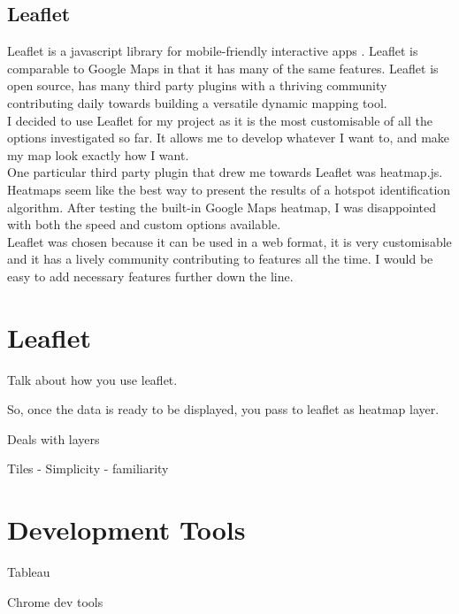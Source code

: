 \subsection{Leaflet}

Leaflet is a javascript library for mobile-friendly interactive apps \cite{leaflet}. Leaflet is comparable to Google Maps in that it has many of the same features. Leaflet is open source, has many third party plugins with a thriving community contributing daily towards building a versatile dynamic mapping tool.\\

I decided to use Leaflet for my project as it is the most customisable of all the options investigated so far. It allows me to develop whatever I want to, and make my map look exactly how I want.\\

One particular third party plugin that drew me towards Leaflet was heatmap.js. Heatmaps seem like the best way to present the results of a hotspot identification algorithm. After testing the built-in Google Maps heatmap, I was disappointed with both the speed and custom options available.\\

Leaflet was chosen because it can be used in a web format, it is very customisable and it has a lively community contributing to features all the time. I would be easy to add necessary features further down the line.

\section{Leaflet}

Talk about how you use leaflet.

So, once the data is ready to be displayed, you pass to leaflet as heatmap layer.

Deals with layers

Tiles - Simplicity - familiarity

\section{Development Tools}

Tableau

Chrome dev tools